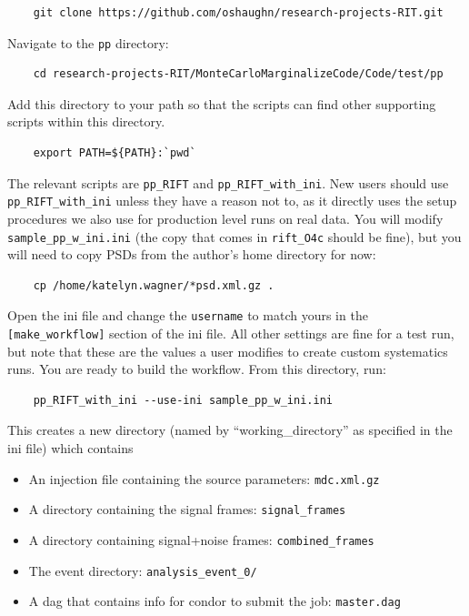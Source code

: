 \documentclass{article}
\begin{document}
\begin{verbatim}
    git clone https://github.com/oshaughn/research-projects-RIT.git
\end{verbatim}

Navigate to the \texttt{pp} directory:
\begin{verbatim}
    cd research-projects-RIT/MonteCarloMarginalizeCode/Code/test/pp
\end{verbatim}

Add this directory to your path so that the scripts can find other supporting scripts within this directory.
\begin{verbatim}
    export PATH=${PATH}:`pwd`
\end{verbatim}
The relevant scripts are \texttt{pp\_RIFT} and \texttt{pp\_RIFT\_with\_ini}. New users should use \texttt{pp\_RIFT\_with\_ini} unless they have a reason not to, as it directly uses the setup procedures we also use for production level runs on real data. You will modify \texttt{sample\_pp\_w\_ini.ini} (the copy that comes in \texttt{rift\_O4c} should be fine), but you will need to copy PSDs from the author's home directory for now:
\begin{verbatim}
    cp /home/katelyn.wagner/*psd.xml.gz .
\end{verbatim}
Open the ini file and change the \texttt{username} to match yours in the \texttt{[make\_workflow]} section of the ini file. All other settings are fine for a test run, but note that these are the values a user modifies to create custom systematics runs. You are ready to build the workflow. From this directory, run:
\begin{verbatim}
    pp_RIFT_with_ini --use-ini sample_pp_w_ini.ini
\end{verbatim}
This creates a new directory (named by “working\_directory” as specified in the ini file) which contains
\begin{itemize}
    \item An injection file containing the source parameters: \texttt{mdc.xml.gz}
    \item A directory containing the signal frames: \texttt{signal\_frames}
    \item A directory containing signal+noise frames: \texttt{combined\_frames}
    \item The event directory: \texttt{analysis\_event\_0/}
    \item A dag that contains info for condor to submit the job: \texttt{master.dag}
\end{itemize}
\end{document}
